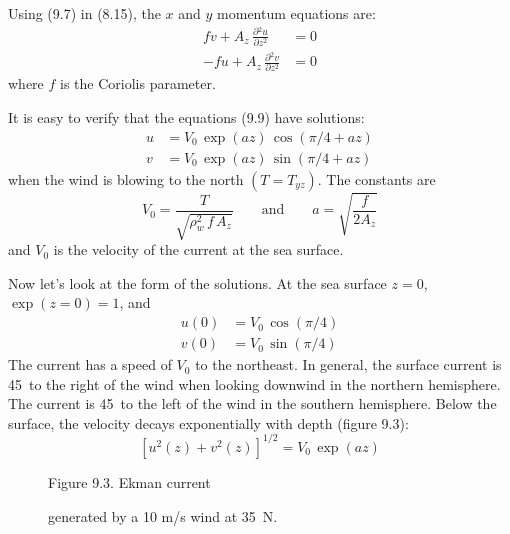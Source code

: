 Using (9.7) in (8.15), the $x$ and $y$ momentum equations are:
\begin{subequations}
\begin{align}
fv +  A_z \, \frac{\partial{^2 u}}{\partial{z^2}} &= 0  \\
-fu + A_z \, \frac{\partial{^2 v}}{\partial{z^2}} &= 0
\end{align}
\end{subequations}
where $f$ is the Coriolis parameter.

It is easy to verify that the equations (9.9) have solutions:
\begin{subequations}
\begin{align}
u &=  V_0\,\exp(az)\,\cos(\pi/4 + az)  \\
v &=  V_0\,\exp(az)\,\sin(\pi/4 + az)
\end{align}
\end{subequations}
when the wind is blowing to the north $(T = T_{yz})$. The constants are
\begin{equation}
V_0 = \frac{T}{\sqrt{\rho^2_w\,f\,A_z}} \qquad \text{and} \qquad
a=\sqrt{\frac{f}{2A_z}}
\end{equation}
and $V_0$ is the velocity of the current at the sea surface.

Now let's look at the form of the solutions. At the sea surface $z = 0$,
$\exp(z=0) = 1$, and
\begin{subequations}
\begin{align}
u(0) &= V_0\, \cos(\pi/4)  \\
v(0) &= V_0\, \sin(\pi/4)
\end{align}
\end{subequations}
The current has a speed of $V_0$ to the northeast. In general, the surface
current is 45\degrees\ to the right of the wind when looking downwind in the
northern hemisphere. The current is 45\degrees\ to the left of the wind in the
southern hemisphere. Below the surface, the velocity decays exponentially with
depth (figure 9.3):
\begin{equation}
\left[u^2(z) + v^2(z) \right]^{1/2} =V_0\,\exp(az)
\end{equation}

\begin{figure}[h!]
\centering
\footnotesize
Figure 9.3. Ekman current \rule{0mm}{4ex}generated by a 10 m/s wind at 35\degrees\ N.

\label{fig:ekmancurrent}
\end{figure}


